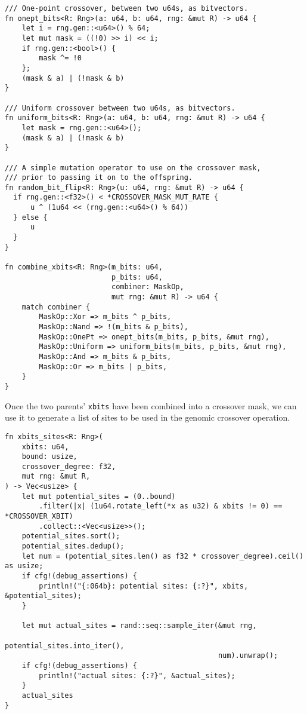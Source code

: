\documentclass[11pt]{article}
\begin{document}
\lstset{language=rust,label=orgdbc8474,caption= ,captionpos=b,numbers=none}
\begin{lstlisting}
/// One-point crossover, between two u64s, as bitvectors.
fn onept_bits<R: Rng>(a: u64, b: u64, rng: &mut R) -> u64 {
    let i = rng.gen::<u64>() % 64;
    let mut mask = ((!0) >> i) << i;
    if rng.gen::<bool>() {
        mask ^= !0
    };
    (mask & a) | (!mask & b)
}

/// Uniform crossover between two u64s, as bitvectors.
fn uniform_bits<R: Rng>(a: u64, b: u64, rng: &mut R) -> u64 {
    let mask = rng.gen::<u64>();
    (mask & a) | (!mask & b)
}

/// A simple mutation operator to use on the crossover mask,
/// prior to passing it on to the offspring.
fn random_bit_flip<R: Rng>(u: u64, rng: &mut R) -> u64 {
  if rng.gen::<f32>() < *CROSSOVER_MASK_MUT_RATE {
      u ^ (1u64 << (rng.gen::<u64>() % 64)) 
  } else {
      u
  }
}

fn combine_xbits<R: Rng>(m_bits: u64,
                         p_bits: u64,
                         combiner: MaskOp,
                         mut rng: &mut R) -> u64 {
    match combiner {
        MaskOp::Xor => m_bits ^ p_bits,
        MaskOp::Nand => !(m_bits & p_bits),
        MaskOp::OnePt => onept_bits(m_bits, p_bits, &mut rng),
        MaskOp::Uniform => uniform_bits(m_bits, p_bits, &mut rng),
        MaskOp::And => m_bits & p_bits,
        MaskOp::Or => m_bits | p_bits,
    }
}
\end{lstlisting}

Once the two parents' \texttt{xbits} have been combined into a crossover mask, we
can use it to generate a list of sites to be used in the genomic crossover
operation. 

\lstset{language=rust,label=org94efb61,caption= ,captionpos=b,numbers=none}
\begin{lstlisting}
fn xbits_sites<R: Rng>(
    xbits: u64,
    bound: usize,
    crossover_degree: f32,
    mut rng: &mut R,
) -> Vec<usize> {
    let mut potential_sites = (0..bound)
        .filter(|x| (1u64.rotate_left(*x as u32) & xbits != 0) == *CROSSOVER_XBIT)
        .collect::<Vec<usize>>();
    potential_sites.sort();
    potential_sites.dedup();
    let num = (potential_sites.len() as f32 * crossover_degree).ceil() as usize;
    if cfg!(debug_assertions) {
        println!("{:064b}: potential sites: {:?}", xbits, &potential_sites);
    }

    let mut actual_sites = rand::seq::sample_iter(&mut rng,
                                                  potential_sites.into_iter(), 
                                                  num).unwrap();
    if cfg!(debug_assertions) {
        println!("actual sites: {:?}", &actual_sites);
    }
    actual_sites
}
\end{lstlisting}
\end{document}
